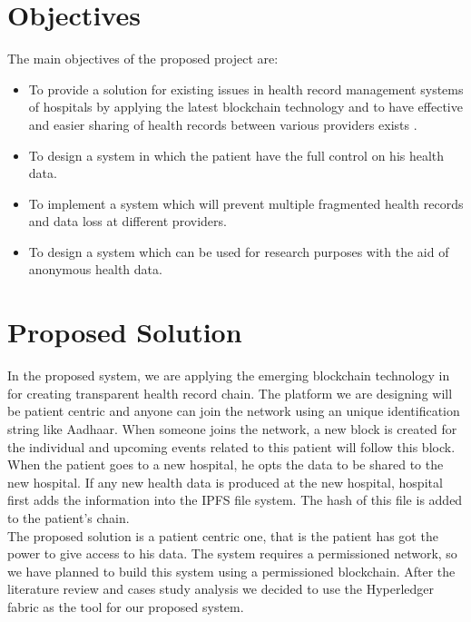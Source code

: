 \documentclass[11pt]{report}
\begin{document}
\section{Objectives}  %

The main objectives of the proposed project are:

\begin{itemize}
        \item To provide a solution for existing issues in health record management systems of hospitals by applying the latest blockchain technology and to have effective and easier sharing of health records between various providers exists .
        \item To design a system in which the patient  have the full control on his health data.
  
        \item To implement a system which will prevent multiple fragmented health records and data loss at different providers.
        \item To design a system which can be used for research purposes with the aid of anonymous health data.
    
    \end{itemize}



\section{Proposed Solution} 

In the proposed system, we are applying  the emerging blockchain technology in for creating transparent health record chain. The platform we are designing will be patient centric and anyone can join the network using an unique identification string like Aadhaar. When someone joins the network, a new block is created for the individual and upcoming events related to this patient will follow this block. When the patient goes to a new hospital, he opts the data to be shared to the new hospital. If any new health data is produced at the new hospital, hospital first adds the information into the IPFS file system. The hash of this file is added to the patient's chain.
\\	The proposed solution is a patient centric one, that is the patient has got the power to give access to his data. The system requires a permissioned network, so we have planned to build this system using a permissioned blockchain. After the literature review and cases study analysis we decided to use the Hyperledger fabric as the tool for our proposed system.
\end{document}
